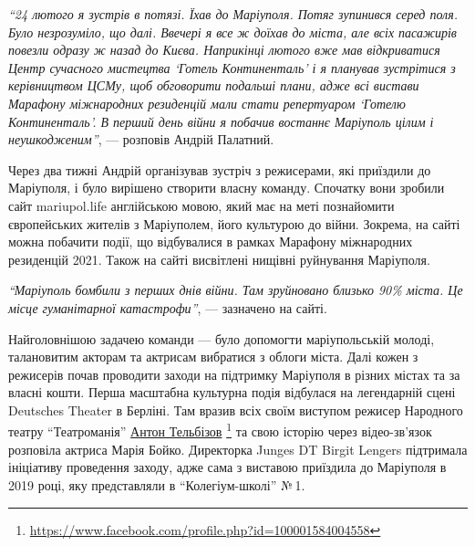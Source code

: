
\begin{leftbar}
  \begingroup
{\em\enquote{24 лютого я зустрів в потязі. Їхав до Маріуполя. Потяг зупинився серед
поля. Було незрозуміло, що далі. Ввечері я все ж доїхав до міста, але
всіх пасажирів повезли одразу ж назад до Києва. Наприкінці лютого вже
мав відкриватися Центр сучасного мистецтва \enquote{Готель Континенталь} і я
планував зустрітися з керівництвом ЦСМу, щоб обговорити подальші плани,
адже всі вистави Марафону міжнародних резиденцій мали стати репертуаром
\enquote{Готелю Континенталь}. В перший день війни я побачив востаннє Маріуполь
цілим і неушкодженим}}, — розповів Андрій Палатний.
   \endgroup
\end{leftbar}

Через два тижні Андрій організував зустріч з режисерами, які приїздили до
Маріуполя, і було вирішено створити власну команду. Спочатку вони зробили сайт
mariupol.life англійською мовою, який має на меті познайомити європейських
жителів з Маріуполем, його культурою до війни. Зокрема, на сайті можна побачити
події, що відбувалися в рамках Марафону міжнародних резиденцій 2021. Також на
сайті висвітлені нищівні руйнування Маріуполя.

\begin{leftbar}
\emph{\enquote{Маріуполь бомбили з перших днів війни. Там зруйновано близько 90\%
міста. Це місце гуманітарної катастрофи}}, — зазначено на сайті.
\end{leftbar}


Найголовнішою задачею команди — було допомогти маріупольській молоді,
талановитим акторам та актрисам вибратися з облоги міста. Далі кожен з
режисерів почав проводити заходи на підтримку Маріуполя в різних містах та за
власні кошти. Перша масштабна культурна подія відбулася на легендарній сцені
Deutsches Theater в Берліні. Там вразив всіх своїм виступом режисер Народного
театру \enquote{Театроманія} \href{https://www.facebook.com/profile.php?id=100001584004558}{Антон Тельбізов}%
\footnote{\url{https://www.facebook.com/profile.php?id=100001584004558}}
та свою історію через відео-зв'язок
розповіла актриса Марія Бойко. Директорка Junges DT Birgit Lengers підтримала
ініціативу проведення заходу, адже сама з виставою приїздила до Маріуполя в
2019 році, яку представляли в \enquote{Колегіум-школі} № 1.

